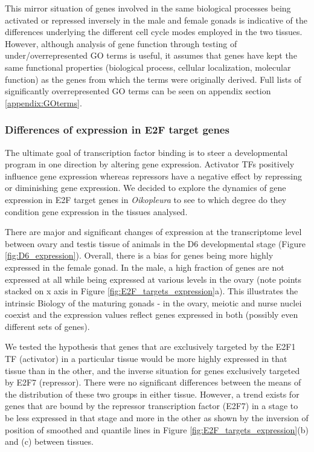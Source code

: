 \documentclass[11pt,twoside,a4paper]{report}
\begin{document}
		This mirror situation of genes involved in the same biological processes being activated or repressed inversely in the male and female gonads is indicative of the differences underlying the different cell cycle modes employed in the two tissues. However, although analysis of gene function through testing of under/overrepresented GO terms is useful, it assumes that genes have kept the same functional properties (biological process, cellular localization, molecular function) as the genes from which the terms were originally derived. Full lists of significantly overrepresented GO terms can be seen on appendix section \ref{appendix:GOterms}.		
		
		\subsubsection{Differences of expression in E2F target genes}
		The ultimate goal of transcription factor binding is to steer a developmental program in one direction by altering gene expression. Activator TFs positively influence gene expression whereas repressors have a negative effect by repressing or diminishing gene expression. We decided to explore the dynamics of gene expression in E2F target genes in \textit{Oikopleura} to see to which degree do they condition gene expression in the tissues analysed. 
		
    	There are major and significant changes of expression at the transcriptome level between ovary and testis tissue of animals in the D6 developmental stage (Figure \ref{fig:D6_expression}). Overall, there is a bias for genes being more highly expressed in the female gonad. In the male, a high fraction of genes are not expressed at all while being expressed at various levels in the ovary (note points stacked on x axis in Figure \ref{fig:E2F_targets_expression}a). This illustrates the intrinsic Biology of the maturing gonads - in the ovary, meiotic and nurse nuclei coexist and the expression values reflect genes expressed in both (possibly even different sets of genes).
		
		We tested the hypothesis that genes that are exclusively targeted by the E2F1 TF (activator) in a particular tissue would be more highly expressed in that tissue than in the other, and the inverse situation for genes exclusively targeted by E2F7 (repressor). There were no significant differences between the means of the distribution of these two groups in either tissue. However, a trend exists for genes that are bound by the repressor transcription factor (E2F7) in a stage to be less expressed in that stage and more in the other as shown by the inversion of position of smoothed and quantile lines in Figure \ref{fig:E2F_targets_expression}(b) and (c) between tissues.
		
\end{document}
